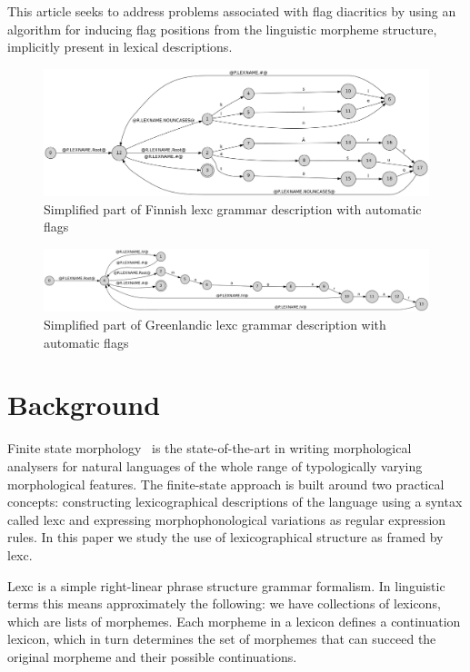 \documentclass[11pt]{article}
\begin{document}
This article seeks to address problems associated with flag diacritics
by using an algorithm for inducing flag positions from the linguistic
morpheme structure, implicitly present in lexical
descriptions.

\begin{figure}
    \includegraphics[width=\textwidth]{transducer.png}
     \caption{Simplified part of Finnish lexc grammar description with automatic flags
     \label{fig:lexc-fin-flag}}
\end{figure}

\begin{figure}
    \includegraphics[width=\textwidth]{gr.png}
     \caption{Simplified part of Greenlandic lexc grammar description with automatic flags
     \label{fig:lexc-gr-flag}}
\end{figure}

\section{Background}

\label{sec:background}

Finite state morphology~\cite{beesley2003finite} is the
state-of-the-art in writing morphological analysers for natural
languages of the whole range of typologically varying morphological
features. The finite-state approach is built around two practical
concepts: constructing lexicographical descriptions of the language
using a syntax called lexc and expressing morphophonological
variations as regular expression rules. In this paper we study the use
of lexicographical structure as framed by lexc. 

Lexc is a simple right-linear phrase structure grammar formalism. In
linguistic terms this means approximately the following: we have
collections of lexicons, which are lists of morphemes. Each morpheme
in a lexicon defines a continuation lexicon, which in turn determines
the set of morphemes that can succeed the original morpheme and their
possible continuations.
\end{document}
